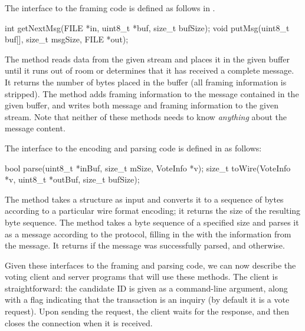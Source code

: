 The interface to the framing code is defined as follows in .
%
\begin{inlinecode}
int getNextMsg(FILE *in, uint8_t *buf, size_t bufSize);
void putMsg(uint8_t buf[], size_t msgSize, FILE *out);
\end{inlinecode}
%
The method  reads data from the given stream and places
it in the given buffer until it runs out of room or determines that it
has received a complete message.  It returns the number of bytes placed
in the buffer (all framing information is stripped).
The method  adds
framing information to the message contained in the given buffer, and
writes both message and framing information to the given stream.  Note that
neither of these methods needs to know \emph{anything\/} about the
message content.

The interface to the encoding and parsing code is defined in
 as follows:
%
\begin{inlinecode}
bool parse(uint8_t *inBuf, size_t mSize, VoteInfo *v);
size_t toWire(VoteInfo *v, uint8_t *outBuf, size_t bufSize);
\end{inlinecode}
%
The  method takes a  structure as input
and converts it to a sequence of bytes according to a particular
wire format encoding; it returns the size of the resulting byte
sequence.
%
The  method takes a byte sequence of a specified size and
parses it as a message according to the protocol, filling in the
 with the information from the message.  It returns
 if the message was successfully parsed, and 
otherwise.

Given these interfaces to the framing and parsing code, we can now
describe the voting client and server programs that will use these
methods.
%
The client is straightforward: the candidate ID is given
as a command-line argument,  along with a flag indicating that the
transaction is an inquiry (by default it is a vote request).
Upon sending the request, the client waits for the response, and then
closes the connection when it is received.


